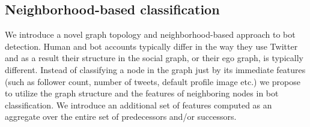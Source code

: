 \subsection{Neighborhood-based classification}
\label{sec:approach}

We introduce a novel graph topology and neighborhood-based approach to bot detection. Human and bot accounts typically differ in the way they use Twitter and as a result their structure in the social graph, or their ego graph, is typically different. Instead of classifying a node in the graph just by its immediate features (such as follower count, number of tweets, default profile image etc.) we propose to utilize the graph structure and the features of neighboring nodes in bot classification. We introduce an additional set of features computed as an aggregate over the entire set of predecessors and/or successors. 

